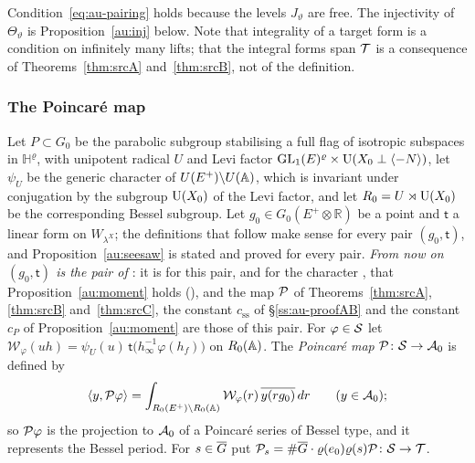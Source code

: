 \documentclass[10pt]{amsart}
\theoremstyle{definition}
\theoremstyle{remark}
\newcommand{\R}{\mathbb R}
\begin{document}
Condition~\eqref{eq:au-pairing} holds because the levels $J_\vartheta$ are free. The injectivity
of $\Theta_\vartheta$ is Proposition~\ref{au:inj} below. Note that integrality of a target form is
a condition on infinitely many lifts; that the integral forms span $\mathcal T$ is a consequence of
Theorems~\ref{thm:srcA} and~\ref{thm:srcB}, not of the definition.

\subsubsection*{The Poincar\'e map}
Let $P\subset G_0$ be the parabolic subgroup stabilising a full flag of isotropic subspaces in
$\mathbb H^\varrho$, with unipotent radical $U$ and Levi factor
$\mathrm{GL}_1(E)^\varrho\times\mathrm U(X_0\perp\langle-N\rangle)$, let $\psi_U$ be the generic character
{\cite[(4)]{P51}} of $U(E^+)\backslash U(\mathbb A)$, which is invariant under conjugation by the subgroup
$\mathrm U(X_0)$ of the Levi factor, and let
$R_0=U\rtimes\mathrm U(X_0)$ be the corresponding Bessel subgroup. Let $g_0\in
G_0(E^+\otimes\R)$ be a point and $\mathsf t$ a linear form on $W_{\lambda^X}$; the definitions that
follow make sense for every pair $(g_0,\mathsf t)$, and Proposition~\ref{au:seesaw} is stated and proved
for every pair. \emph{From now on $(g_0,\mathsf t)$ is the pair of {\cite[Theorem~2.4]{P51}}}: it is for this
pair, and for the character {\cite[(4)]{P51}}, that Proposition~\ref{au:moment} holds
({\cite[Theorem~2.15]{P51}}), and the map $\mathcal P$ of Theorems~\ref{thm:srcA}, \ref{thm:srcB} and~\ref{thm:srcC}, the
constant $c_{\mathrm{ss}}$ of \S\ref{ss:au-proofAB} and the constant $c_P$ of
Proposition~\ref{au:moment} are those of this pair. For $\varphi\in\mathcal S$ let
$\mathcal W_\varphi(uh)=\psi_U(u)\,\mathsf t\bigl(h_\infty^{-1}\varphi(h_f)\bigr)$ on
$R_0(\mathbb A)$. The \emph{Poincar\'e map} $\mathcal P\colon\mathcal S\to\mathcal A_0$ is defined by
\[
\langle y,\mathcal P\varphi\rangle=\int_{R_0(E^+)\backslash R_0(\mathbb A)}\mathcal W_\varphi(r)\,
\overline{y(rg_0)}\,dr\qquad(y\in\mathcal A_0);
\]
so $\mathcal P\varphi$ is the projection to $\mathcal A_0$ of a Poincar\'e series of Bessel type, and it
represents the Bessel period. For $s\in\overline G$ put $\mathcal P_s=\#\overline G\cdot\varrho(e_0)\varrho(s)\mathcal P
\colon\mathcal S\to\mathcal T$.
\end{document}

